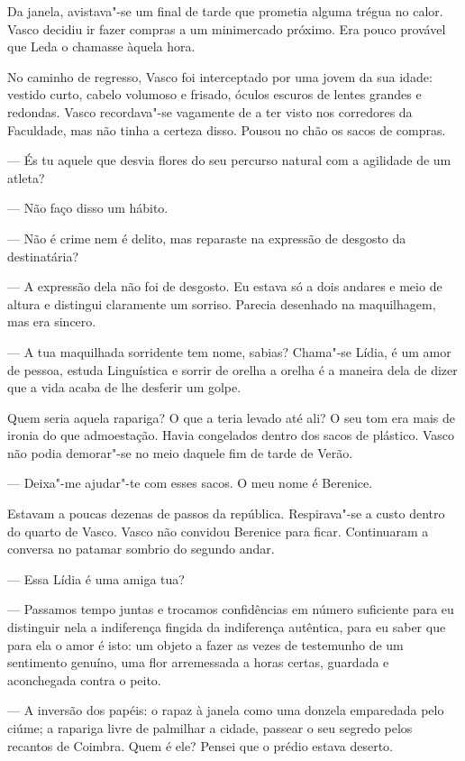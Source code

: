 Da janela, avistava"-se um
final de tarde que prometia alguma trégua no calor. Vasco decidiu ir
fazer compras a um minimercado próximo. Era pouco provável que Leda o
chamasse àquela hora.

No caminho de regresso, Vasco foi interceptado por uma jovem da sua
idade: vestido curto, cabelo volumoso e frisado, óculos escuros de
lentes grandes e redondas. Vasco recordava"-se vagamente de a ter visto nos corredores da Faculdade, mas não tinha
a certeza disso. Pousou no chão os sacos de compras.

--- És tu aquele que desvia flores do seu percurso natural com a agilidade
  de um atleta?

--- Não faço disso um hábito.

--- Não é crime nem é delito, mas reparaste na expressão de desgosto da
  destinatária?

--- A expressão dela não foi de desgosto. Eu estava só a dois andares e
  meio de altura e distingui claramente um sorriso. Parecia desenhado
  na maquilhagem, mas era sincero.

--- A tua maquilhada sorridente tem nome, sabias? Chama"-se Lídia, é um
  amor de pessoa, estuda Linguística e sorrir de orelha a orelha é a
  maneira dela de dizer que a vida acaba de lhe desferir um golpe.

Quem seria aquela rapariga? O que a teria levado até ali? O seu tom era
mais de ironia do que admoestação. Havia congelados dentro dos sacos de
plástico. Vasco não podia demorar"-se no meio daquele fim de tarde de
Verão.

--- Deixa"-me ajudar"-te com esses sacos. O meu nome é Berenice.

Estavam a poucas dezenas de passos da república. Respirava"-se a custo
dentro do quarto de Vasco. Vasco não convidou Berenice para ficar.
Continuaram a conversa no patamar sombrio do segundo andar.

--- Essa Lídia é uma amiga tua?

--- Passamos tempo juntas e trocamos confidências em número suficiente
  para eu distinguir nela a indiferença fingida da indiferença
  autêntica, para eu saber que para ela o amor é isto: um objeto a
  fazer as vezes de testemunho de um sentimento genuíno, uma flor
  arremessada a horas certas, guardada e aconchegada contra o peito.

--- A inversão dos papéis: o rapaz à janela como uma donzela emparedada
  pelo ciúme; a rapariga livre de palmilhar a cidade, passear o seu
  segredo pelos recantos de Coimbra. Quem é ele? Pensei que o prédio
  estava deserto.

